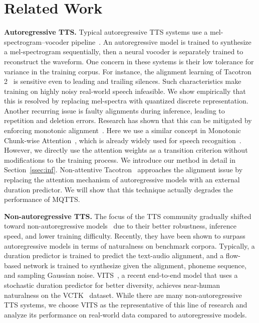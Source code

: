 \documentclass[letterpaper]{article} %
\begin{document}
\section{Related Work}

\textbf{Autoregressive TTS.}
Typical autoregressive TTS systems use a mel-spectrogram--vocoder pipeline~\cite{8461368,Li_Liu_Liu_Zhao_Liu_2019}.
An autoregressive model is trained to synthesize a mel-spectrogram sequentially, then a neural vocoder is separately trained  to reconstruct the waveform.
One concern in these systems is their low tolerance for variance  in the training corpus.
For instance, the alignment learning of Tacotron 2~\cite{8461368} is sensitive even to leading and trailing silences.
Such characteristics make training on highly noisy real-world speech infeasible.
We show empirically that this is resolved by replacing mel-spectra with quantized discrete representation.
Another recurring issue is faulty alignments during inference, leading to repetition and deletion errors.
Research has shown that this can be mitigated by enforcing monotonic alignment~\cite{DBLP:conf/interspeech/HeDH19,DBLP:journals/corr/abs-2103-16710}.
Here we use a similar concept in Monotonic Chunk-wise Attention~\cite{DBLP:conf/iclr/ChiuR18}, which is already widely used for speech recognition~\cite{DBLP:journals/corr/abs-2005-00205}.
However, we directly use the attention weights as a transition criterion without modifications to the training process.
We introduce our method in detail in Section~\ref{ssec:inf}.
Non-attentive Tacotron~\cite{DBLP:journals/corr/abs-2010-04301} approaches the alignment issue by replacing the attention mechanism of autoregressive models with an external duration predictor.
We will show that this technique actually degrades the performance of MQTTS.

\textbf{Non-autoregressive TTS.}
The focus of the TTS community gradually shifted toward non-autoregressive models~\cite{ pmlr-v139-kim21f,NEURIPS2020_5c3b99e8,NEURIPS2019_f63f65b5} due to their better robustness, inference speed, and lower training difficulty.
Recently, they have been shown to surpass autoregressive models in terms of naturalness on benchmark corpora.
Typically, a duration predictor is trained to predict the text-audio alignment, and a flow-based network is trained to synthesize given the alignment, phoneme sequence, and sampling Gaussian noise.
VITS~\cite{pmlr-v139-kim21f}, a recent end-to-end model that uses a stochastic duration predictor for better diversity, achieves near-human naturalness on the VCTK~\cite{VCTK} dataset.
While there are many non-autoregressive TTS systems, we choose VITS as the representative of this line of research and analyze its performance on real-world data compared to autoregressive models.
\end{document}
